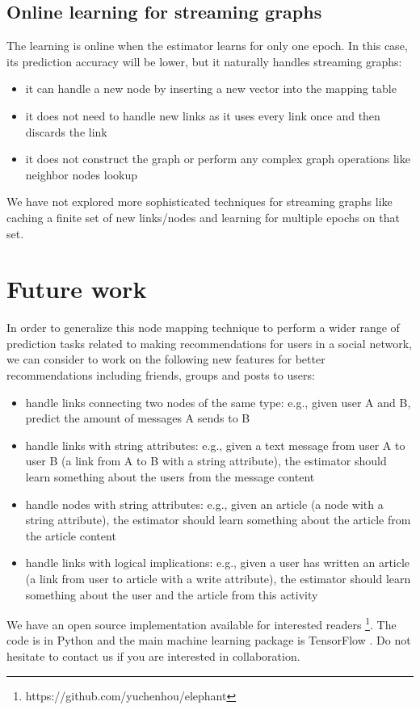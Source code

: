\documentclass{article}
\begin{document}
\subsection{Online learning for streaming graphs}
The learning is online when the estimator learns for only one epoch. In 
this case, its prediction accuracy will be lower, but it naturally handles 
streaming graphs:
\begin{itemize}
	\item it can handle a new node by inserting a new vector into the mapping 
	table
	\item it does not need to handle new links as it uses every link once and 
	then discards the link
	\item it does not construct the graph or perform any complex graph 
	operations like neighbor nodes lookup
\end{itemize}
We have not explored more sophisticated techniques for streaming graphs like 
caching a finite set of new links/nodes and learning for multiple epochs on 
that set.

\section{Future work}
In order to generalize this node mapping technique to perform a wider range of 
prediction tasks related to making recommendations for users in a social 
network,
we can consider to work on the following new features for better 
recommendations including friends, groups and posts to users:
\begin{itemize}
	\item handle links connecting two nodes of the same type: e.g., given user 
	A and B, predict the amount of messages A sends to B
	\item handle links with string attributes: e.g., given a text message from 
	user A to user B (a link from A to B with a string attribute), the 
	estimator should learn something about the users from the message content
	\item handle nodes with string attributes: e.g., given an article (a node 
	with a string attribute), the estimator should learn something about the 
	article from the article content
	\item handle links with logical implications: e.g., given a user has 
	written an article (a link from user to article with a write attribute), 
	the estimator should learn something about the user and the article from 
	this activity
\end{itemize}
We have an open source implementation available for interested readers  
\footnote{https://github.com/yuchenhou/elephant}.
The code is in Python and the main machine learning package is TensorFlow 
\cite{abadi2016tensorflow}.
Do not hesitate to contact us if you are interested in collaboration.
\end{document}
